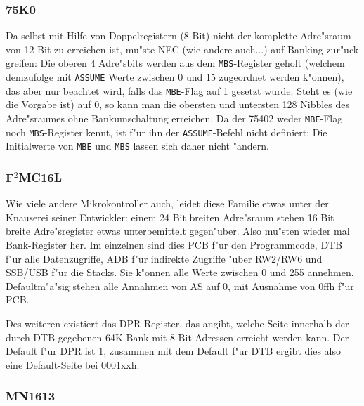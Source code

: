 \documentclass[12pt,a4paper,twoside]{report}
\newcommand{\tty}[1]{{\tt #1}}
\newcommand{\asname}{AS}
\begin{document}

\subsubsection{75K0}

Da selbst mit Hilfe von Doppelregistern (8 Bit) nicht der komplette
Adre"sraum von 12 Bit zu erreichen ist, mu"ste NEC (wie andere auch...)
auf Banking zur"uck greifen: Die oberen 4 Adre"sbits werden aus dem
\tty{MBS}-Register geholt (welchem demzufolge mit \tty{ASSUME} Werte
zwischen 0 und 15 zugeordnet werden k"onnen), das aber nur beachtet
wird, falls das \tty{MBE}-Flag auf 1 gesetzt wurde.  Steht es (wie
die Vorgabe ist) auf 0, so kann man die obersten und untersten 128
Nibbles des Adre"sraumes ohne Bankumschaltung erreichen.  Da der 75402
weder \tty{MBE}-Flag noch \tty{MBS}-Register kennt, ist f"ur ihn der
\tty{ASSUME}-Befehl nicht definiert; Die Initialwerte von \tty{MBE} und
\tty{MBS} lassen sich daher nicht "andern.


\subsubsection{F$^2$MC16L}

Wie viele andere Mikrokontroller auch, leidet diese Familie etwas unter
der Knauserei seiner Entwickler: einem 24 Bit breiten Adre"sraum stehen 16
Bit breite Adre"sregister etwas unterbemittelt gegen"uber.  Also mu"sten
wieder mal Bank-Register her.  Im einzelnen sind dies PCB f"ur den
Programmcode, DTB f"ur alle Datenzugriffe, ADB f"ur indirekte Zugriffe
"uber RW2/RW6 und SSB/USB f"ur die Stacks.  Sie k"onnen alle Werte
zwischen 0 und 255 annehmen.  Defaultm"a"sig stehen alle Annahmen von \asname{}
auf 0, mit Ausnahme von 0ffh f"ur PCB.

Des weiteren existiert das DPR-Register, das angibt, welche Seite
innerhalb der durch DTB gegebenen 64K-Bank mit 8-Bit-Adressen erreicht
werden kann.  Der Default f"ur DPR ist 1, zusammen mit dem Default f"ur
DTB ergibt dies also eine Default-Seite bei 0001xxh.


\subsubsection{MN1613}
\end{document}
